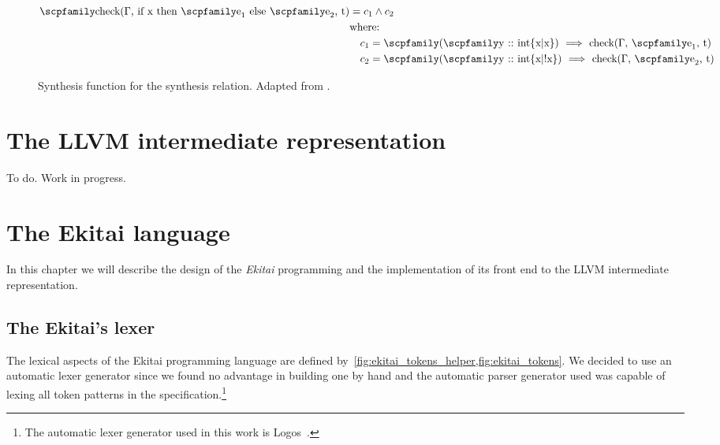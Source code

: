 \documentclass[
  oneside,
  english,
  coorientadorbanca,
  noabntexcite
]{ufsc-thesis-rn46-2019}
\newcommand{\code}[1]{\text{\scpfamily\setlength\spaceskip{0.35em}#1}}
\newcommand{\implcons}[3]{\code{$($\code{#1} $::$ #2$)$ $\implies$ #3}}
\begin{document}
\begin{figure}[ht]
\begin{align*}
    \code{check($\Gamma$, if x then $\code{e}_1$ else $\code{e}_2$, t)}
     & = c_1 \land c_2                                                         \\
     & \textrm{where:}                                                         \\
     & \quad c_1 = \implcons{y}{int\{x|x\}}{check($\Gamma$, $\code{e}_1$, t)}  \\
     & \quad c_2 = \implcons{y}{int\{x|!x\}}{check($\Gamma$, $\code{e}_2$, t)}
  \end{align*}
  \caption{
    Synthesis function for the synthesis relation.
    Adapted from \textcite{jhala2020tutorial}.
  }\label{fig:check_function_impl}
\end{figure}

\chapter{The LLVM intermediate representation}\label{ch:llvm}

To do. Work in progress.

\chapter{The Ekitai language}\label{chapter:proposal}

In this chapter we will describe the design of the \textit{Ekitai} programming and the implementation of its front end to the LLVM intermediate representation.

\section{The Ekitai's lexer}

The lexical aspects of the Ekitai programming language are defined by~\cref{fig:ekitai_tokens_helper,fig:ekitai_tokens}.
We decided to use an automatic lexer generator since we found no advantage in building one by hand and the automatic parser generator used was capable of lexing all token patterns in the specification.\footnote{The automatic lexer generator used in this work is Logos~\cite{logos2020}.}
\end{document}
